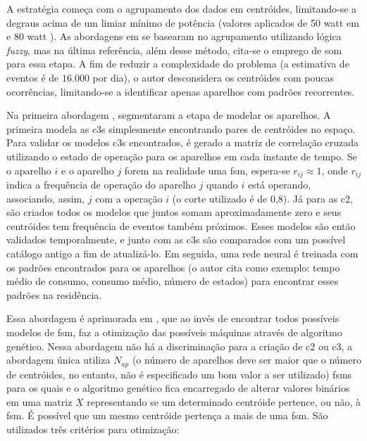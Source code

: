 \begin{enumerate}[label=\textbf{1.\arabic*},wide=\parindent]
\begin{enumerate}[label*=.\textbf{\arabic*},wide=\parindent]
\begin{itemize}[wide=\parindent]
A estratégia começa com o agrupamento dos dados em centróides,
limitando-se a degraus acima de um limiar mínimo de potência (valores
aplicados de 50 \acrshort{watt} em
\cite{nilm_baranski_genetic_base_2003_19} e 80 \acrshort{watt}
\cite{nilm_baranski_genetic_detalhado_2004_20}). As abordagens em
\cite{nilm_baranski_genetic_base_2003_19,
nilm_baranski_genetic_detalhado_2004_20} se basearam no agrupamento
utilizando lógica \emph{fuzzy}, mas na última referência, além desse
método, cita-se o emprego de \gls{som} para essa etapa. A fim de
reduzir a complexidade do problema (a estimativa de eventos é de
$16.000$ por dia), o autor desconsidera os centróides com poucas
ocorrências, limitando-se a identificar apenas aparelhos com padrões
recorrentes. 

Na primeira abordagem \cite{nilm_baranski_genetic_base_2003_19},
\citeauthor*{nilm_baranski_genetic_base_2003_19} segmentaram a etapa
de modelar os aparelhos. A primeira modela as \glspl{c3} simplesmente
encontrando pares de centróides no espaço. Para validar os modelos
\glspl{c3} encontrados, é gerado a matriz de correlação cruzada
utilizando o estado de operação para os aparelhos em cada instante de
tempo. Se o aparelho $i$ e o aparelho $j$ forem na realidade uma
\gls{fsm}, espera-se $r_{ij}\approx1$, onde $r_{ij}$ indica a
frequência de operação do aparelho $j$ quando $i$ está operando,
associando, assim, $j$ com a operação $i$ (o corte utilizado é de
0,8). Já para as \gls{c2}, são criados todos os modelos que
juntos somam aproximadamente zero e seus centróides tem frequência de
eventos também próximos. Esses modelos são então validados
temporalmente, e junto com as \glspl{c3} são comparados com um
possível catálogo antigo a fim de atualizá-lo. Em seguida, uma rede
neural é treinada com os padrões encontrados para os aparelhos (o
autor cita como exemplo: tempo médio de consumo, consumo médio, número
de estados) para encontrar esses padrões na residência.

Essa abordagem é aprimorada em
\cite{nilm_baranski_genetic_detalhado_2004_20,nilm_baranski_summary_2004_21},
que ao invés de encontrar todos possíveis modelos de \gls{fsm},
faz a otimização das possíveis máquinas através de algoritmo genético.
Nessa abordagem não há a discriminação para a criação de \gls{c2} ou
\gls{c3}, a abordagem única utiliza $N_{ap}$ (o número de aparelhos
deve ser maior que o número de centróides, no entanto, não é
especificado um bom valor a ser utilizado) \glspl{fsm} para os quais e o
algoritmo genético fica encarregado de alterar valores binários em uma
matriz $\underline{X}$ representando se um determinado centróide
pertence, ou não, à \gls{fsm}. É possível que um mesmo centróide
pertença a mais de uma \gls{fsm}. São utilizados três critérios para
otimização: 


\end{itemize}
\end{enumerate}
\end{enumerate}
